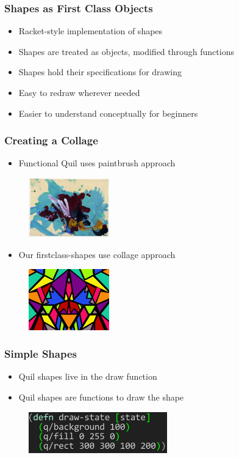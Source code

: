 \documentclass{beamer}
\begin{document}
\begin{frame}
\frametitle{Shapes as First Class Objects}
	\begin{itemize}
		\item Racket-style implementation of shapes
		\item Shapes are treated as objects, modified through functions
		\item Shapes hold their specifications for drawing
		\item Easy to redraw wherever needed
		\item Easier to understand conceptually for beginners
	\end{itemize}
\end{frame}

\begin{frame}
\frametitle{Creating a Collage}
	\begin{itemize}
		\item Functional Quil uses paintbrush approach
	\end{itemize}
	\begin{figure}
	\includegraphics[width=3.5cm]{PresentationImages/painting.jpg}
	\end{figure}
	\begin{itemize}
		\item Our firstclass-shapes use collage approach
	\end{itemize}
	\begin{figure}
	\includegraphics[width=3.5cm]{PresentationImages/collage.jpg}
	\end{figure}
\end{frame}

\begin{frame}
\frametitle{Simple Shapes}
	\begin{itemize}
		\item Quil shapes live in the draw function
		\item Quil shapes are functions to draw the shape
	\end{itemize}
	\begin{figure}
		\includegraphics[width=6cm]{PresentationImages/quilGreenRect.png}
	\end{figure}
\end{frame}
\end{document}

